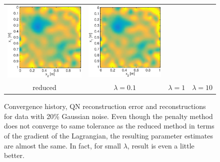 \documentclass{iopart}
\begin{document}
\begin{figure}
\begin{tabular}{cccc}
\includegraphics[scale=.2]{./figs/2D_exp4_h}&
\includegraphics[scale=.2]{./figs/2D_exp4_i}\\
{\small reduced}&{\small $\lambda=0.1$}&{\small $\lambda=1$}&{\small $\lambda=10$}\\
\end{tabular}
\caption{Convergence history, QN reconstruction error and reconstructions for data with 20\% Gaussian noise. Even though the penalty method does not converge to same tolerance as the reduced method in terms of the gradient of the Lagrangian, the resulting parameter estimates are almost the same. In fact, for small $\lambda$, result is even a little better.}
\label{fig:2D_exp4}
\end{figure}
\end{document}
